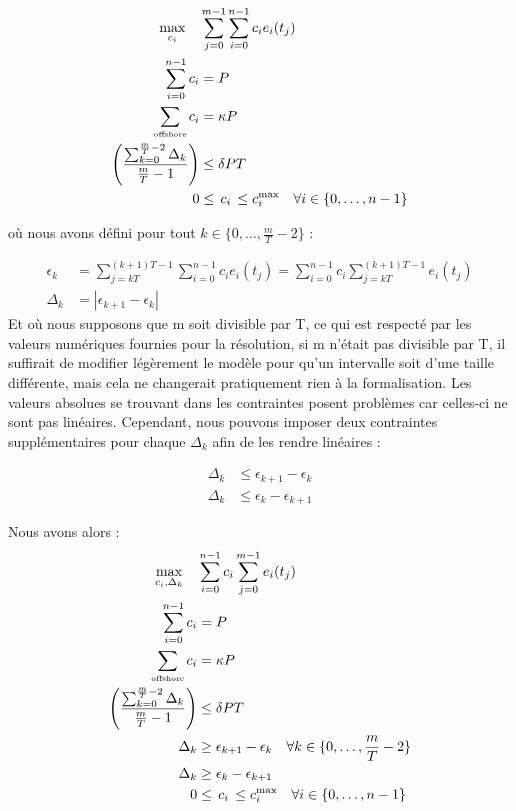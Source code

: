 \documentclass{article}
\begin{document}
\begin{align*}
    \max_{c_i} \quad  
    &\sum_{j = 0}^{m-1} \sum_{i = 0}^{n-1} c_i e_i(t_j) \\ 
    \sum_{i=0}^{n-1} c_i &= P\\
    \sum_{\text{\tiny offshore}}c_i &= \kappa P\\
    \left( \frac{\sum_{k = 0}^{\frac{m}{T} - 2} \Delta_k }{\frac{m}{T} - 1}\right) &\leq \delta PT\\
    0 &\le \, c_i \, \le c_i^{\max} \quad \forall i \in \{0, \ldots, n-1\}
\end{align*}

où nous avons défini pour tout $k \in \{ 0, \ldots, \frac{m}{T} - 2 \}$ :

\begin{align*}
    \epsilon_k &= \sum_{j = kT}^{(k+1)T - 1} \sum_{i = 0}^{n-1} c_i e_i(t_j) = \sum_{i=0}^{n-1} c_i \sum_{j = kT}^{(k+1)T - 1} e_i(t_j)\\
    \Delta_k &= | \epsilon_{k+1} - \epsilon_k |
\end{align*}
Et où nous supposons que m soit divisible par T, ce qui est respecté par les valeurs numériques fournies pour la résolution, si m n'était pas divisible par T, il suffirait de modifier légèrement le modèle pour qu'un intervalle soit d'une taille différente, mais cela ne changerait pratiquement rien à la formalisation.
Les valeurs absolues se trouvant dans les contraintes posent problèmes car celles-ci ne sont pas linéaires. Cependant, nous pouvons imposer deux contraintes supplémentaires pour chaque $\Delta_k$ afin de les rendre linéaires :

\begin{align*}
    \Delta_k &\leq \epsilon_{k+1} - \epsilon_k\\
    \Delta_k &\leq \epsilon_k - \epsilon_{k+1}
\end{align*}

Nous avons alors :
\begin{align*}
    \max_{c_i, \Delta_k} \quad  
    &\sum_{i=0}^{n-1} c_i \sum_{j = 0}^{m - 1} e_i(t_j) \\ 
    \sum_{i=0}^{n-1} c_i &= P\\
    \sum_{\text{\tiny offshore}}c_i &= \kappa P\\
    \left( \frac{\sum_{k = 0}^{\frac{m}{T} - 2} \Delta_k }{\frac{m}{T} - 1}\right) &\leq \delta PT\\
    \Delta_k &\ge \epsilon_{k+1} - \epsilon_k \quad \forall k \in \{ 0, \ldots, \frac{m}{T} - 2 \}\\
    \Delta_k &\ge \epsilon_k - \epsilon_{k+1}\\
    0 &\le \, c_i \, \le c_i^{\max} \quad \forall i \in \{0, \ldots, n-1\}
\end{align*}
\end{document}
